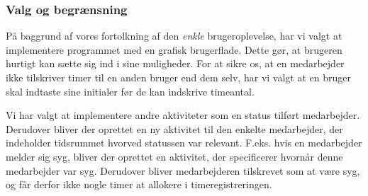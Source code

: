\subsubsection{Valg og begrænsning} 
På baggrund af vores fortolkning af den \textit{enkle} brugeroplevelse, har vi valgt at implementere programmet med en grafisk brugerflade. Dette gør, at brugeren hurtigt kan sætte sig ind i sine muligheder. For at sikre os, at en medarbejder ikke tilskriver timer til en anden bruger end dem selv, har vi valgt at en bruger skal indtaste sine initialer før de kan indskrive timeantal.

Vi har valgt at implementere andre aktiviteter som en status tilført medarbejder. Derudover bliver der oprettet en ny aktivitet til den enkelte medarbejder, der indeholder tidsrummet hvorved statussen var relevant. F.eks. hvis en medarbejder melder sig syg, bliver der oprettet en aktivitet, der specificerer hvornår denne medarbejder var syg. Derudover bliver medarbejderen tilskrevet som at være syg, og får derfor ikke nogle timer at allokere i timeregistreringen.
